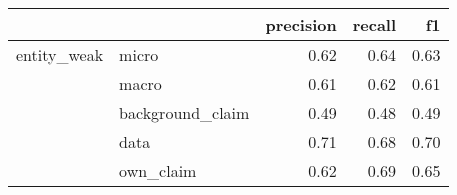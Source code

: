 \begin{tabular}{llrrr}
\toprule
            &           &  precision &  recall &   f1 \\
\midrule
entity\_weak & micro &       0.62 &    0.64 & 0.63 \\
            & macro &       0.61 &    0.62 & 0.61 \\
            & background\_claim &       0.49 &    0.48 & 0.49 \\
            & data &       0.71 &    0.68 & 0.70 \\
            & own\_claim &       0.62 &    0.69 & 0.65 \\
\bottomrule
\end{tabular}
